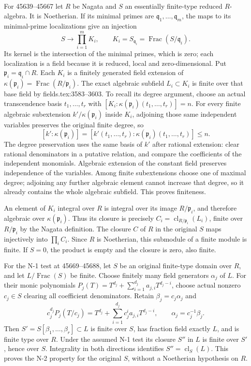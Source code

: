 For 45639--45667 let \(R\) be Nagata and \(S\) an essentially finite-type reduced \(R\)-algebra. It is Noetherian. If its minimal primes are \(\mathfrak q_1,\ldots,\mathfrak q_m\), the maps to its minimal-prime localizations give an injection \[
 S\longrightarrow\prod_{i=1}^m K_i,
 \qquad K_i=S_{\mathfrak q_i}=\operatorname{Frac}(S/\mathfrak q_i).
\] Its kernel is the intersection of the minimal primes, which is zero; each localization is a field because it is reduced, local and zero-dimensional. Put \(\mathfrak p_i=\mathfrak q_i\cap R\). Each \(K_i\) is a finitely generated field extension of \(\kappa(\mathfrak p_i)=\operatorname{Frac}(R/\mathfrak p_i)\). The exact algebraic subfield \(L_i\subset K_i\) is finite over that base field by fields.tex:3583--3603. To recall its degree argument, choose an actual transcendence basis \(t_1,\ldots,t_r\) with \([K_i:\kappa(\mathfrak p_i)(t_1,\ldots,t_r)]=n\). For every finite algebraic subextension \(k'/\kappa(\mathfrak p_i)\) inside \(K_i\), adjoining those same independent variables preserves the original finite degree, so \[
 [k':\kappa(\mathfrak p_i)]
 =[k'(t_1,\ldots,t_r):\kappa(\mathfrak p_i)(t_1,\ldots,t_r)]\leq n.
\] The degree preservation uses the same basis of \(k'\) after rational extension: clear rational denominators in a putative relation, and compare the coefficients of the independent monomials. Algebraic extension of the constant field preserves independence of the variables. Among finite subextensions choose one of maximal degree; adjoining any further algebraic element cannot increase that degree, so it already contains the whole algebraic subfield. This proves finiteness.

An element of \(K_i\) integral over \(R\) is integral over its image \(R/\mathfrak p_i\), and therefore algebraic over \(\kappa(\mathfrak p_i)\). Thus its closure is precisely \(C_i=\operatorname{cl}_{R/\mathfrak p_i}(L_i)\), finite over \(R/\mathfrak p_i\) by the Nagata definition. The closure \(C\) of \(R\) in the original \(S\) maps injectively into \(\prod_i C_i\). Since \(R\) is Noetherian, this submodule of a finite module is finite. If \(S=0\), the product is empty and the closure is zero, also finite.

For the N-1 test at 45669--45688, let \(S\) be an original finite-type domain over \(R\), and let \(L/\operatorname{Frac}(S)\) be finite. Choose finitely many field generators \(\alpha_j\) of \(L\). For their monic polynomials \(P_j(T)=T^{d_j}+\sum_{i=1}^{d_j}a_{j,i}T^{d_j-i}\), choose actual nonzero \(c_j\in S\) clearing all coefficient denominators. Retain \(\beta_j=c_j\alpha_j\) and \[
 c_j^{d_j}P_j(T/c_j)
 =T^{d_j}+\sum_{i=1}^{d_j}c_j^i a_{j,i}T^{d_j-i},
 \qquad \alpha_j=c_j^{-1}\beta_j.
\] Then \(S'=S[\beta_1,\ldots,\beta_r]\subset L\) is finite over \(S\), has fraction field exactly \(L\), and is finite type over \(R\). Under the assumed N-1 test its closure \(S''\) in \(L\) is finite over \(S'\), hence over \(S\). Integrality in both directions identifies \(S''=\operatorname{cl}_S(L)\). This proves the N-2 property for the original \(S\), without a Noetherian hypothesis on \(R\).

